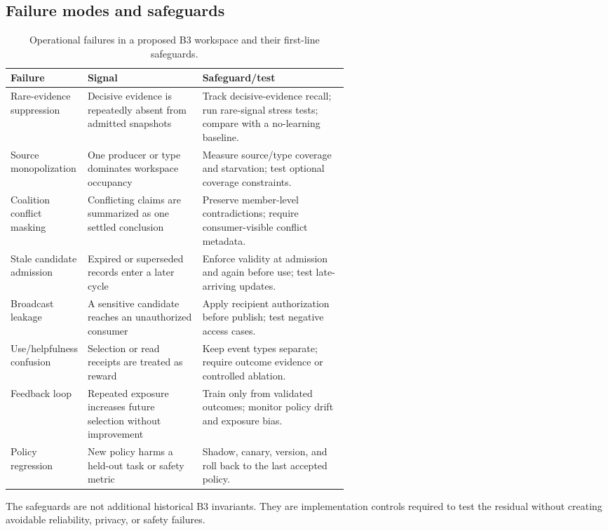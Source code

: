 \subsection{Failure modes and safeguards}

\begin{table}[tbp]
\centering
\small
\caption{Operational failures in a proposed B3 workspace and their first-line safeguards.}
\label{tab:ch14-failures}
\begin{tabularx}{\linewidth}{@{}P{0.22\linewidth}P{0.34\linewidth}X@{}}
\toprule
\textbf{Failure} & \textbf{Signal} & \textbf{Safeguard/test} \\
\midrule
Rare-evidence suppression & Decisive evidence is repeatedly absent from admitted snapshots & Track decisive-evidence recall; run rare-signal stress tests; compare with a no-learning baseline. \\
Source monopolization & One producer or type dominates workspace occupancy & Measure source/type coverage and starvation; test optional coverage constraints. \\
Coalition conflict masking & Conflicting claims are summarized as one settled conclusion & Preserve member-level contradictions; require consumer-visible conflict metadata. \\
Stale candidate admission & Expired or superseded records enter a later cycle & Enforce validity at admission and again before use; test late-arriving updates. \\
Broadcast leakage & A sensitive candidate reaches an unauthorized consumer & Apply recipient authorization before publish; test negative access cases. \\
Use/helpfulness confusion & Selection or read receipts are treated as reward & Keep event types separate; require outcome evidence or controlled ablation. \\
Feedback loop & Repeated exposure increases future selection without improvement & Train only from validated outcomes; monitor policy drift and exposure bias. \\
Policy regression & New policy harms a held-out task or safety metric & Shadow, canary, version, and roll back to the last accepted policy. \\
\bottomrule
\end{tabularx}
\end{table}

The safeguards are not additional historical B3 invariants. They are implementation controls required to test the residual without creating avoidable reliability, privacy, or safety failures.

